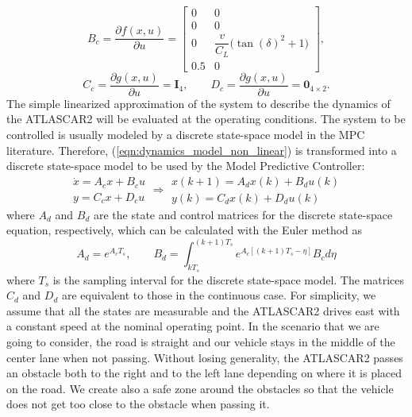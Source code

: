 \documentclass[conference,11pt]{IEEEtran}
\renewcommand{\vec}[1]{\ensuremath{\boldsymbol{\mathit{#1}}}}
\begin{document}
\[
\vec{B}_c=\frac{\partial \vec{f}(\vec{x},\vec{u})}{\partial \vec{u}}=\begin{bmatrix}
0&0\\
0&0\\
0&\dfrac{v}{C_L}\big(\tan(\delta)^2+1\big)\\
0.5&0
\end{bmatrix},
\]
\[
\vec{C}_c=\frac{\partial \vec{g}(\vec{x},\vec{u})}{\partial \vec{u}} = \mathbf{I}_4, 
\qquad
\vec{D}_c=\frac{\partial \vec{g}(\vec{x},\vec{u})}{\partial \vec{u}}=\mathbf{0}_{4\times2}. 
\]
The simple linearized approximation of the system to describe the dynamics of the ATLASCAR2 will be evaluated at the operating conditions. The system to be controlled is usually modeled by a discrete state-space model in the MPC literature. Therefore, (\ref{eqn:dynamics_model_non_linear})
is transformed into a discrete state-space model to be used by the Model Predictive Controller:
\begin{equation*}
\label{eqn:dynamics_ss_obstacle_avoidance_dis}
	\begin{array}{ll}
	\dot{\vec{x}} =\vec{A}_c \vec{x}+ \vec{B}_c \vec{u}\\
	\vec{y} =\vec{C}_c \vec{x} + \vec{D}_c \vec{u}
	\end{array}
	\Rightarrow
	\begin{array}{rr}
	{\vec{x}}(k+1) =\vec{A}_d \vec{x}(k)+ \vec{B}_d \vec{u}(k)\\
	\vec{y}(k) =\vec{C}_d \vec{x}(k) + \vec{D}_d \vec{u}(k)
	\end{array}
\end{equation*}
where $\vec{A}_d$ and $\vec{B}_d$ are the state and control matrices for the discrete state-space equation, respectively, which can be calculated with the Euler method as
\[
\vec{A}_d = e^{\vec{A}_cT_s},\qquad \vec{B}_d = \int_{kT_s}^{(k+1)T_s} e^{\vec{A}_c[(k+1)T_s-\eta]}\vec{B}_c d\eta
\]
where $T_s$ is the sampling interval for the discrete state-space model. The matrices $\vec{C}_d$ and $\vec{D}_d$ are equivalent to those in the continuous case. For simplicity, we assume that all the states are measurable and the ATLASCAR2 drives east with a constant speed at the nominal operating point. In the scenario that we are going to consider, the road is straight and our vehicle stays in the middle of the center lane when not passing. Without losing generality, the ATLASCAR2 passes an obstacle both to the right and to the left lane depending on where it is placed on the road. We create also a safe zone around the obstacles so that the vehicle does not get too close to the obstacle when passing it.
\end{document}
